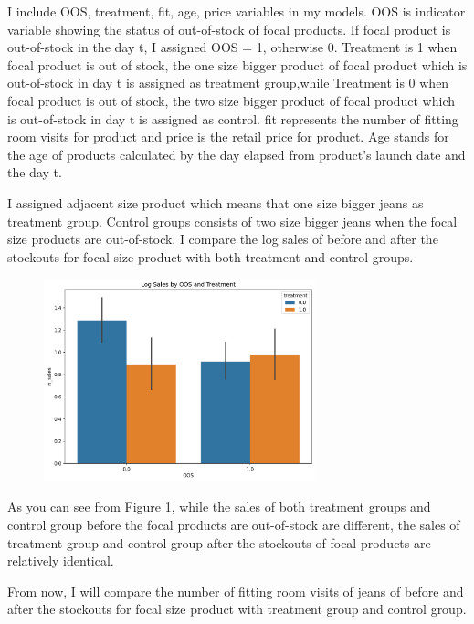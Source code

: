 \documentclass[letterpaper,12pt]{article}
\theoremstyle{definition}
\begin{document}
     I include OOS, treatment, fit, age, price variables in my models. OOS is indicator variable showing the status of out-of-stock of focal products. If focal product is out-of-stock in the day t, I assigned OOS = 1, otherwise 0. Treatment is 1 when focal product is out of stock, the one size bigger product of focal product which is out-of-stock in day t is assigned as treatment group,while Treatment is 0 when focal product is out of stock, the two size bigger product of focal product which is out-of-stock in day t is assigned as control. fit represents the number of fitting room visits for product and price is the retail price for product.  Age stands for the age of products calculated by the day elapsed from product's launch date and the day t.      \vspace{1mm}
     
     I assigned adjacent size product which means that one size bigger jeans as treatment group. Control groups consists of two size bigger jeans when the focal size products are out-of-stock. I compare the log sales of before and after the stockouts for focal size product with both treatment and control groups. 
		
	\begin{figure}[H]
		\centering
		\includegraphics[width=0.7\textwidth]{images/LogSales.png}
		\caption{}
		\label{Log Sales by Treatment Group}
	\end{figure}
	
	As you can see from Figure 1, while the sales of both treatment groups and control group before the focal products are out-of-stock are different, the sales of treatment group and control group after the stockouts of focal products are relatively identical. 
	
	From now, I will compare the number of fitting room visits of jeans of before and after the stockouts for focal size product with treatment group and control group.	
	
\end{document}
